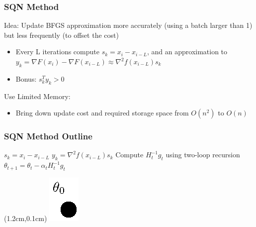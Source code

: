 \documentclass{beamer}
\begin{document}
\begin{frame}
	\frametitle{SQN Method}
	Idea: Update BFGS approximation more accurately (using a batch larger than 1) but less frequently (to offset the cost)
	\begin{itemize}
		\item Every L iterations compute $s_k = x_i - x_{i-L}$, and an approximation to $y_k = \nabla F(x_i) - \nabla F(x_{i-L}) \approx \nabla^2 f(x_{i-L}) s_k$ \\
		\item Bonus: $s_k^T y_k > 0$ 
	\end{itemize}
	\pause
	Use Limited Memory:
	\begin{itemize}
		\item Bring down update cost and required storage space from $O(n^2)$ to $O(n)$
	\end{itemize}
\end{frame}

\begin{frame}
	\frametitle{SQN Method Outline}
	\begin{algorithmic} [1] 
		\LOOP 
		\STATE $s_k = x_i - x_{i-L}$
		\STATE $y_k = \nabla^2 f(x_{i-L}) s_k$
		\ENDIF
		\STATE Compute $H_t^{-1} g_t$ using two-loop recursion
		\STATE $\theta_{t+1}= \theta_t - \alpha_t H_t^{-1} g_t$ 
		\ENDLOOP 
	\end{algorithmic}
\end{frame}


							 \begin{frame}
\begin{textblock*}{0.2cm}(1.2cm,0.1cm) %
							 				\includegraphics[scale=0.5]{figures/11.eps}
\end{textblock*}
							 \end{frame}
\end{document}
